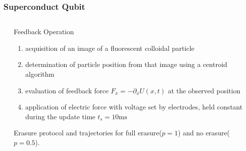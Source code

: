 \documentclass[aspectratio=169,10pt]{beamer}
\begin{document}
\begin{frame}
    \frametitle{Superconduct Qubit}
    \begin{columns}
        \begin{column}{0.5\textwidth}
            \centering

        \end{column}
        \begin{column}{0.5\textwidth}
            \centering
            \begin{block}{Feedback Operation\cite{jun2014high}}
                \begin{enumerate}
                    \item acquisition of an image of a fluorescent colloidal particle
                    \item determination of particle position from that image using a centroid algorithm
                    \item evaluation of feedback force $F_x=-\partial_xU(x,t)$ at the observed position
                    \item application of electric force with voltage set by electrodes, held constant during the update time $t_s=10\mathrm{ms}$
                \end{enumerate}
            \end{block}

            Erasure protocol and trajectories for full erasure($p=1$) and no erasure($p=0.5$). 
        \end{column}
    \end{columns}
\end{frame}
\end{document}
